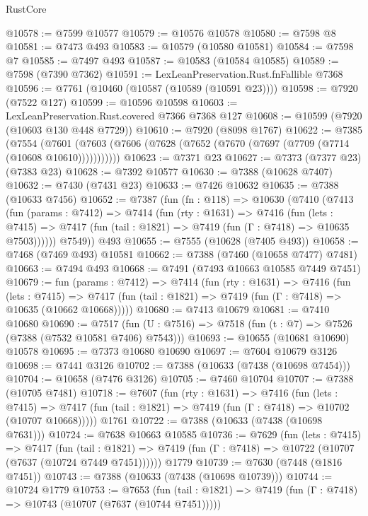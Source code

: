 \begin{lexlean}{RustCore}
\begin{coremodule}
@10578 := @7599 @10577
@10579 := @10576 @10578
@10580 := @7598 @8
@10581 := @7473 @493
@10583 := @10579 (@10580 @10581)
@10584 := @7598 @7
@10585 := @7497 @493
@10587 := @10583 (@10584 @10585)
@10589 := @7598 (@7390 @7362)
@10591 := LexLeanPreservation.Rust.fnFallible @7368
@10596 := @7761 (@10460 (@10587 (@10589 (@10591 @23))))
@10598 := @7920 (@7522 @127)
@10599 := @10596 @10598
@10603 := LexLeanPreservation.Rust.covered @7366 @7368 @127
@10608 := @10599 (@7920 (@10603 @130 @448 @7729))
@10610 := @7920 (@8098 @1767)
@10622 := @7385
    (@7554 (@7601 (@7603 (@7606 (@7628 (@7652 (@7670 (@7697 (@7709 (@7714 (@10608 @10610)))))))))))
@10623 := @7371 @23
@10627 := @7373 (@7377 @23) (@7383 @23)
@10628 := @7392 @10577
@10630 := @7388 (@10628 @7407)
@10632 := @7430 (@7431 @23)
@10633 := @7426 @10632
@10635 := @7388 (@10633 @7456)
@10652 := @7387
    (fun (fn : @118) =>
    @10630
      (@7410
        (@7413
          (fun (params : @7412) =>
          @7414
            (fun (rty : @1631) =>
            @7416
              (fun (lets : @7415) =>
              @7417 (fun (tail : @1821) => @7419 (fun (Γ : @7418) => @10635 @7503))))))
        @7549))
    @493
@10655 := @7555 (@10628 (@7405 @493))
@10658 := @7468 (@7469 @493) @10581
@10662 := @7388 (@7460 (@10658 @7477) @7481)
@10663 := @7494 @493
@10668 := @7491 (@7493 @10663 @10585 @7449 @7451)
@10679 := fun (params : @7412) =>
  @7414
    (fun (rty : @1631) =>
    @7416
      (fun (lets : @7415) =>
      @7417 (fun (tail : @1821) => @7419 (fun (Γ : @7418) => @10635 (@10662 @10668)))))
@10680 := @7413 @10679
@10681 := @7410 @10680
@10690 := @7517
    (fun (U : @7516) => @7518 (fun (t : @7) => @7526 (@7388 (@7532 @10581 @7406) @7543)))
@10693 := @10655 (@10681 @10690) @10578
@10695 := @7373 @10680 @10690
@10697 := @7604 @10679 @3126
@10698 := @7441 @3126
@10702 := @7388 (@10633 (@7438 (@10698 @7454)))
@10704 := @10658 (@7476 @3126)
@10705 := @7460 @10704
@10707 := @7388 (@10705 @7481)
@10718 := @7607
    (fun (rty : @1631) =>
    @7416
      (fun (lets : @7415) =>
      @7417 (fun (tail : @1821) => @7419 (fun (Γ : @7418) => @10702 (@10707 @10668)))))
    @1761
@10722 := @7388 (@10633 (@7438 (@10698 @7631)))
@10724 := @7638 @10663 @10585
@10736 := @7629
    (fun (lets : @7415) =>
    @7417
      (fun (tail : @1821) =>
      @7419 (fun (Γ : @7418) => @10722 (@10707 (@7637 (@10724 @7449 @7451))))))
    @1779
@10739 := @7630 (@7448 (@1816 @7451))
@10743 := @7388 (@10633 (@7438 (@10698 @10739)))
@10744 := @10724 @1779
@10753 := @7653
    (fun (tail : @1821) => @7419 (fun (Γ : @7418) => @10743 (@10707 (@7637 (@10744 @7451)))))

\end{coremodule}
\end{lexlean}
